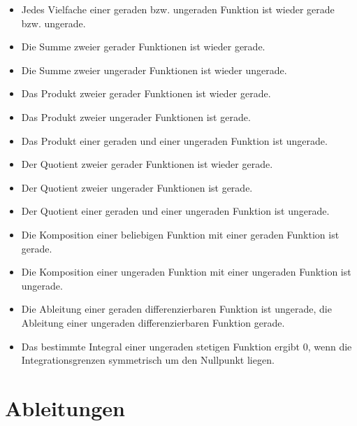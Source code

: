\documentclass[a4paper,fontsize = 7pt]{scrartcl}
\begin{document}
\begin{itemize}
	\item Jedes Vielfache einer geraden bzw. ungeraden Funktion ist wieder gerade bzw. ungerade.
	\item Die Summe zweier gerader Funktionen ist wieder gerade.
	\item Die Summe zweier ungerader Funktionen ist wieder ungerade.
	\item Das Produkt zweier gerader Funktionen ist wieder gerade.
	\item Das Produkt zweier ungerader Funktionen ist gerade.
	\item Das Produkt einer geraden und einer ungeraden Funktion ist ungerade.
	\item Der Quotient zweier gerader Funktionen ist wieder gerade.
	\item Der Quotient zweier ungerader Funktionen ist gerade.
	\item Der Quotient einer geraden und einer ungeraden Funktion ist ungerade.
	\item Die Komposition einer beliebigen Funktion mit einer geraden Funktion ist gerade.
	\item Die Komposition einer ungeraden Funktion mit einer ungeraden Funktion ist ungerade.
	\item Die Ableitung einer geraden differenzierbaren Funktion ist ungerade, die Ableitung einer ungeraden differenzierbaren Funktion gerade. 
	\item Das bestimmte Integral einer ungeraden stetigen Funktion ergibt $0$, wenn die Integrationsgrenzen symmetrisch um den Nullpunkt liegen.
\end{itemize}


\section{Ableitungen}
\end{document}
